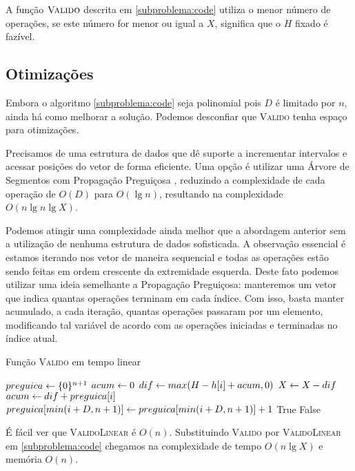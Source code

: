A função $\textsc{Valido}$ descrita em \ref{subproblema:code} utiliza o menor número de operações, se este número for menor ou igual a $X$, significa que o $H$ fixado é fazível.

\subsection{Otimizações}

Embora o algoritmo \ref{subproblema:code} seja polinomial pois $D$ é limitado por $n$, ainda há como melhorar a solução. Podemos desconfiar que \textsc{Valido} tenha espaço para otimizações. 

Precisamos de uma estrutura de dados que dê suporte a incrementar intervalos e acessar posições do vetor de forma eficiente. Uma opção é utilizar uma Árvore de Segmentos com Propagação Preguiçosa \cite{matheusmso}, reduzindo a complexidade de cada operação de $O(D)$ para $O(\lg n)$, resultando na complexidade $O(n \lg n \lg X)$.

Podemos atingir uma complexidade ainda melhor que a abordagem anterior sem a utilização de nenhuma estrutura de dados sofisticada. A observação essencial é estamos iterando nos vetor de maneira sequencial e todas as operações estão sendo feitas em ordem crescente da extremidade esquerda. Deste fato podemos utilizar uma ideia semelhante a Propagação Preguiçosa: manteremos um vetor que indica quantas operações terminam em cada índice. Com isso, basta manter acumulado, a cada iteração, quantas operações passaram por um elemento, modificando tal variável de acordo com as operações iniciadas e terminadas no índice atual.

\begin{algorithm}[H]
\caption{Função \textsc{Valido} em tempo linear}
\label{subproblema:code_linear}
\begin{algorithmic}[1]
    \State $preguica \leftarrow \{0\}^{n + 1}$
    \State $acum \leftarrow 0$
        \State $dif \leftarrow max(H - h[i] + acum, 0)$
        \State $X \leftarrow X - dif$
        \State $acum \leftarrow dif + preguica[i]$
        \State $preguica[min(i + D, n + 1)] \leftarrow preguica[min(i + D, n + 1)] + 1$
    \EndFor
        \State \Return True
    \Else
        \State \Return False
    \EndIf
\EndFunction
\end{algorithmic}
\end{algorithm}

É fácil ver que \textsc{ValidoLinear} é $O(n)$. Substituindo \textsc{Valido} por \textsc{ValidoLinear} em \ref{subproblema:code} chegamos na complexidade de tempo $O(n \lg X)$ e memória $O(n)$.

